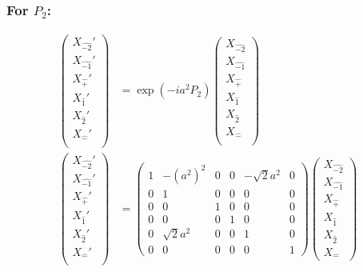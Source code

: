 \documentclass[]{article}
\numberwithin{equation}{section}
\begin{document}
{{\subsubsection{For $P_{2}$:}
\begin{align}
\begin{pmatrix}
    {X}_{\hat{-2}}'\\
    {X}_{\hat{-1}}'\\
    {X}_{\hat{+}}'\\
    {X}_{\hat{1}}'\\
    {X}_{\hat{2}}'\\
    {X}_{\hat{-}}'\\
    \end{pmatrix}&= \exp{(-ia^{2} P_{2})}\begin{pmatrix}
    {X}_{\hat{-2}}\\
    {X}_{\hat{-1}}\\
    {X}_{\hat{+}}\\
    {X}_{\hat{1}}\\
    {X}_{\hat{2}}\\
    {X}_{\hat{-}}\\
    \end{pmatrix}\\
    \begin{pmatrix}
    {X}_{\hat{-2}}'\\
    {X}_{\hat{-1}}'\\
    {X}_{\hat{+}}'\\
    {X}_{\hat{1}}'\\
    {X}_{\hat{2}}'\\
    {X}_{\hat{-}}'\\
    \end{pmatrix}&= \begin{pmatrix}
        1&-(a^{2})^{2}&0&0&-\sqrt{2}a^{2}&0\\
        0&1&0&0&0&0\\
        0&0&1&0&0&0\\
        0&0&0&1&0&0\\
        0&\sqrt{2}a^{2}&0&0&1&0\\
        0&0&0&0&0&1
    \end{pmatrix}\begin{pmatrix}
    {X}_{\hat{-2}}\\
    {X}_{\hat{-1}}\\
    {X}_{\hat{+}}\\
    {X}_{\hat{1}}\\
    {X}_{\hat{2}}\\
    {X}_{\hat{-}}

\end{pmatrix}
\end{align}}}
\end{document}

